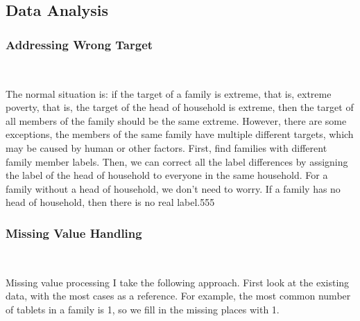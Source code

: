 
\subsection{Data Analysis}

\subsubsection{Addressing Wrong Target}
\

The normal situation is: if the target of a family is extreme, that is, extreme poverty, that is, the target of the head of household is extreme, then the target of all members of the family should be the same extreme. However, there are some exceptions, the members of the same family have multiple different targets, which may be caused by human or other factors.
First, find families with different family member labels. Then, we can correct all the label differences by assigning the label of the head of household to everyone in the same household.
For a family without a head of household, we don't need to worry. If a family has no head of household, then there is no real label.555

\subsubsection{Missing Value Handling}
\

Missing value processing I take the following approach. First look at the existing data, with the most cases as a reference. For example, the most common number of tablets in a family is 1, so we fill in the missing places with 1.

